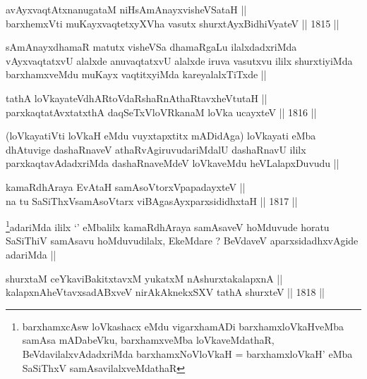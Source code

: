 

\begin{shl}
avAyxvaqtAtxnanugataM niHsAmAnayxvisheVSataH ||  \\
barxhemxVti muKayxvaqtetxyXVha vasutx shurxtAyx\s BidhiVyateV ||  1815 ||  
\end{shl}

\begin{artha}
sAmAnayxdhamaR matutx visheVSa dhamaRgaLu ilalxdadxriMda vAyxvaqtatxvU
alalxde anuvaqtatxvU alalxde iruva vasutxvu ililx shurxtiyiMda
barxhamxveMdu muKayx vaqtitxyiMda kareyalalxTiTxde || 
\end{artha}


\begin{shl}
tathA loVkayateVdhARtoVdaRshaRnAthaRtavxheVtutaH ||  \\
parxkaqtatAvxtatxthA daqSeTxVloVRkanaM loVka ucayxteV ||  1816 ||  
\end{shl}

\begin{artha}
(loVkayatiVti loVkaH eMdu vuyxtapxtitx mADidAga) loVkayati eMba
  dhAtuvige dashaRnaveV athaRvAgiruvudariMdalU dashaRnavU ililx
  parxkaqtavAdadxriMda dashaRnaveMdeV loVkaveMdu heVLalapxDuvudu ||
\end{artha}

\begin{shl}
kamaRdhAraya EvAtaH samAsoV\s torxVpapadayxteV || \\
na tu SaSiThxVsamAsoV\s tarx viBAgasAyxparxsididhxtaH ||  1817 ||  
\end{shl}

\begin{artha}
\footnote[1]{barxhamxcAsw loVkashacx eMdu vigarxhamADi
  barxhamxloVkaHveMba samAsa mADabeVku, barxhamxveMba loVkaveMdathaR,
  BeVdavilalxvAdadxriMda barxhamxNoVloVkaH = barxhamxloVkaH' eMba
  SaSiThxV samAsavilalxveMdathaR}adariMda ililx `\stext' eMbalilx kamaRdhAraya samAsaveV
hoMduvude horatu SaSiThiV samAsavu hoMduvudilalx, EkeMdare ? BeVdaveV
aparxsidadhxvAgide adariMda ||
\end{artha}


\begin{shl}
shurxtaM ceYkaviBakitxtavxM yukatxM nAshurxtakalapxnA || \\
kalapxnAheVtavxsadABxveV nirAkAknekxSXV tathA shurxteV ||  1818 ||  
\end{shl}

